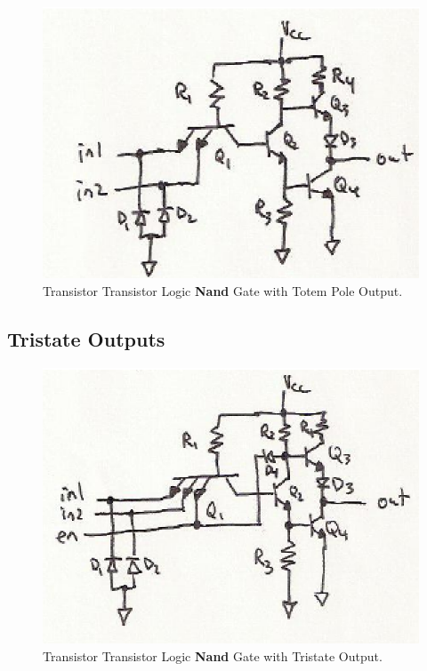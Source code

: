 \begin{figure}
\begin{center}
\caption{Transistor Transistor Logic \textbf{Nand} Gate with Totem Pole Output.}\label{f:TTL_nand_totem}
\includegraphics{images/TTLnand_totempole.eps}
\end{center}
\end{figure}

\subsection{Tristate Outputs}

\begin{figure}
\begin{center}
\caption{Transistor Transistor Logic \textbf{Nand} Gate with Tristate Output.}\label{f:TTL_nand_tristate}
\includegraphics{images/TTLnand_tristate.eps}
\end{center}
\end{figure}

